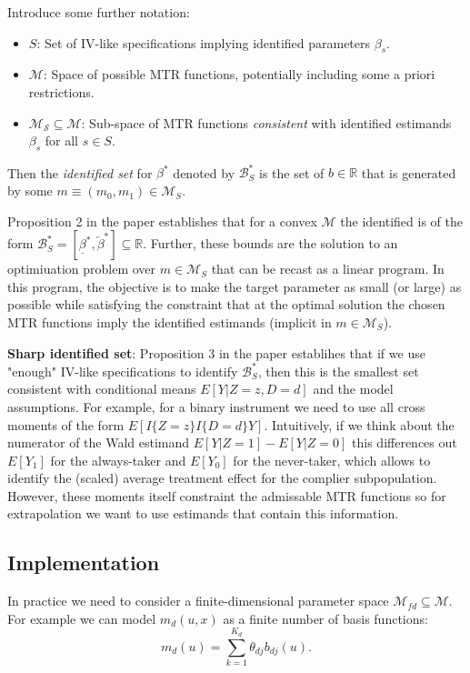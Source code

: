 \documentclass{article}
\begin{document}
Introduce some further notation:
\begin{itemize}
    \item $S$: Set of IV-like specifications implying identified parameters $\beta_s$.
    \item $\mathcal{M}$: Space of possible MTR functions, potentially including some a priori restrictions.
    \item $\mathcal{M_S}\subseteq \mathcal{M}$: Sub-space of MTR functions \textit{consistent} with identified estimands $\beta_s$ for all $s\in S$.
\end{itemize}

Then the \textit{identified set} for $\beta^*$ denoted by $\mathcal{B}_S^*$ is the set of $b\in\mathbb{R}$ that is generated by some $m\equiv(m_0, m_1)\in \mathcal{M}_S$.

Proposition 2 in the paper establishes that for a convex $\mathcal{M}$ the identified is of the form $\mathcal{B}^*_S = [\underline{\beta}^*, \overleftarrow{\beta}^*]\subseteq \mathbb{R}$. 
Further, these bounds are the solution to an optimiuation problem over $m\in\mathcal{M}_S$ that can be recast as a linear program.
In this program, the objective is to make the target parameter as small (or large) as possible while satisfying the constraint that at the optimal solution the chosen MTR functions imply the identified estimands (implicit in $m\in\mathcal{M}_S$).

\textbf{Sharp identified set}: Proposition 3 in the paper establihes that if we use "enough" IV-like specifications to identify $\mathcal{B}^*_S$, then this is the smallest set consistent with conditional means $E[Y|Z=z, D=d]$ and the model assumptions.
For example, for a binary instrument we need to use all cross moments of the form $E[I\{Z=z\}I\{D=d\}Y]$.
Intuitively, if we think about the numerator of the Wald estimand $E[Y|Z=1] - E[Y|Z=0]$ this differences out $E[Y_1]$ for the always-taker and $E[Y_0]$ for the never-taker, which allows to identify the (scaled) average treatment effect for the complier subpopulation.
However, these moments itself constraint the admissable MTR functions so for extrapolation we want to use estimands that contain this information.


\subsection{Implementation}
In practice we need to consider a finite-dimensional parameter space $\mathcal{M}_{fd}\subseteq \mathcal{M}$.
For example we can model $m_d(u,x)$ as a finite number of basis functions:
\begin{equation*}
    m_d(u) = \sum_{k=1}^{K_d}\theta_{dj}b_{dj}(u).
\end{equation*}
\end{document}
